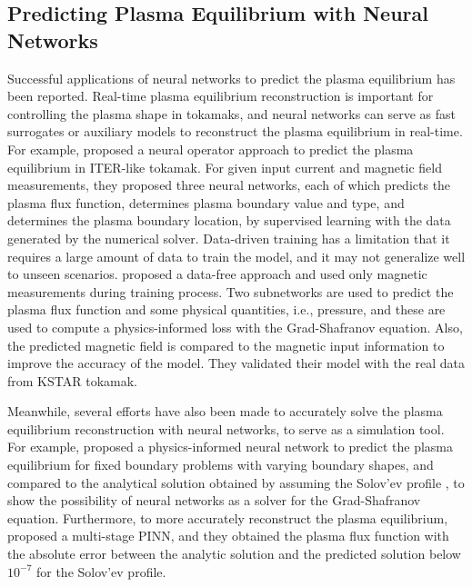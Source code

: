 \subsection{Predicting Plasma Equilibrium with Neural Networks}

Successful applications of neural networks to predict the plasma equilibrium 
\cite{bonotto,gsdeepnet,JangPINN,multistagePINN,summaryNOGS,NNGS,NNFB,PINNFNOGS,Degrave2022,Seo2024} has been reported.
Real-time plasma equilibrium reconstruction is important 
for controlling the plasma shape in tokamaks,
and neural networks can serve as fast surrogates or auxiliary models
to reconstruct the plasma equilibrium in real-time.
For example, \cite{bonotto} proposed a neural operator approach 
to predict the plasma equilibrium in ITER-like tokamak.
For given input current and magnetic field measurements, they proposed three neural networks,
each of which predicts the plasma flux function, 
determines plasma boundary value and type, and determines the plasma boundary location, 
by supervised learning with the data generated by the numerical solver.
Data-driven training has a limitation that it requires a large amount of data 
to train the model, and it may not generalize well to unseen scenarios.   
\cite{gsdeepnet} proposed a data-free approach and used only magnetic measurements during training 
process. Two subnetworks are used to predict the plasma flux function and some 
physical quantities, i.e., pressure, and these are used to compute a physics-informed loss  
with the Grad-Shafranov equation.
Also, the predicted magnetic field is compared to the magnetic input information to improve the 
accuracy of the model. 
They validated their model with the real data from KSTAR \cite{KSTAR} tokamak.

Meanwhile, several efforts have also been made to accurately 
solve the plasma equilibrium reconstruction 
with neural networks, to serve as a simulation tool.
For example, \cite{JangPINN} proposed a physics-informed neural network to predict
the plasma equilibrium for fixed boundary problems with varying boundary shapes,
and compared to the analytical solution obtained by assuming the Solov'ev profile
\cite{Solovev}, to show the possibility of neural networks as a solver for the Grad-Shafranov equation.
Furthermore, to more accurately reconstruct the plasma equilibrium,
\cite{multistagePINN} proposed a 
multi-stage PINN, and they obtained the plasma flux function with the absolute error
between the analytic solution and the predicted solution below $10^{-7}$ for the Solov'ev profile.

